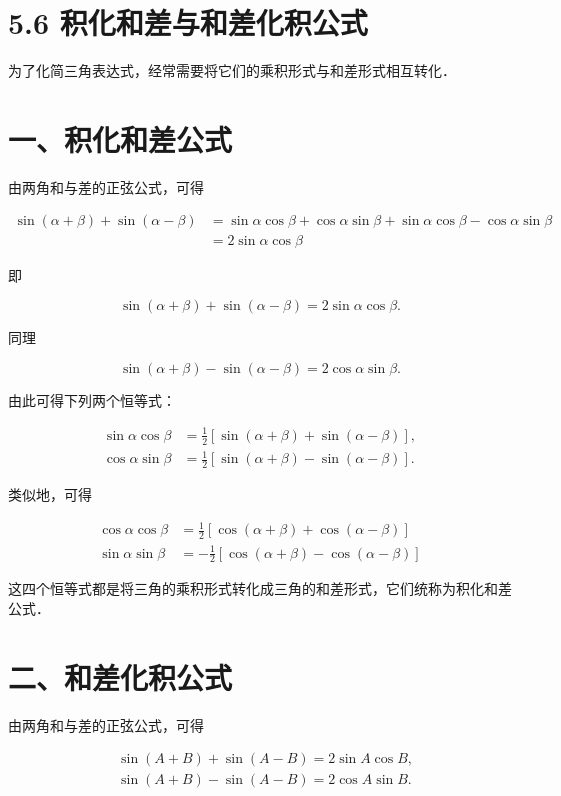 \documentclass[10pt]{article}
\begin{document}
\section*{5.6 积化和差与和差化积公式}
为了化简三角表达式，经常需要将它们的乘积形式与和差形式相互转化．

\section*{一、积化和差公式}
由两角和与差的正弦公式，可得

\[
\begin{aligned}
\sin (\alpha+\beta)+\sin (\alpha-\beta) & =\sin \alpha \cos \beta+\cos \alpha \sin \beta+\sin \alpha \cos \beta-\cos \alpha \sin \beta \\
& =2 \sin \alpha \cos \beta
\end{aligned}
\]

即

\[
\sin (\alpha+\beta)+\sin (\alpha-\beta)=2 \sin \alpha \cos \beta .
\]

同理

\[
\sin (\alpha+\beta)-\sin (\alpha-\beta)=2 \cos \alpha \sin \beta .
\]

由此可得下列两个恒等式：

\[
\begin{aligned}
\sin \alpha \cos \beta & =\frac{1}{2}[\sin (\alpha+\beta)+\sin (\alpha-\beta)], \\
\cos \alpha \sin \beta & =\frac{1}{2}[\sin (\alpha+\beta)-\sin (\alpha-\beta)] .
\end{aligned}
\]

类似地，可得

\[
\begin{aligned}
\cos \alpha \cos \beta & =\frac{1}{2}[\cos (\alpha+\beta)+\cos (\alpha-\beta)] \\
\sin \alpha \sin \beta & =-\frac{1}{2}[\cos (\alpha+\beta)-\cos (\alpha-\beta)]
\end{aligned}
\]

这四个恒等式都是将三角的乘积形式转化成三角的和差形式，它们统称为积化和差公式．

\section*{二、和差化积公式}
由两角和与差的正弦公式，可得

\[
\begin{aligned}
& \sin (A+B)+\sin (A-B)=2 \sin A \cos B, \\
& \sin (A+B)-\sin (A-B)=2 \cos A \sin B .
\end{aligned}
\]
\end{document}
